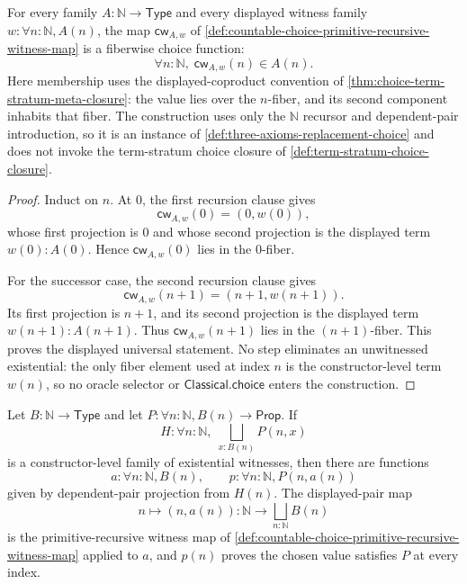 \begin{theorem}
\label{thm:countable-choice-primitive-recursive-witness-function}
For every family $A:\mathbb{N}\to\mathsf{Type}$ and every displayed witness family $w:\forall n:\mathbb{N},A(n)$, the map $\mathsf{cw}_{A,w}$ of \autoref{def:countable-choice-primitive-recursive-witness-map} is a fiberwise choice function:
$$
\forall n:\mathbb{N},\;\mathsf{cw}_{A,w}(n)\in A(n).
$$
Here membership uses the displayed-coproduct convention of \autoref{thm:choice-term-stratum-meta-closure}: the value lies over the $n$-fiber, and its second component inhabits that fiber. The construction uses only the $\mathbb{N}$ recursor and dependent-pair introduction, so it is an instance of \autoref{def:three-axioms-replacement-choice} and does not invoke the term-stratum choice closure of \autoref{def:term-stratum-choice-closure}.
\end{theorem}

\begin{proof}
Induct on $n$. At $0$, the first recursion clause gives
$$
\mathsf{cw}_{A,w}(0)=(0,w(0)),
$$
whose first projection is $0$ and whose second projection is the displayed term $w(0):A(0)$. Hence $\mathsf{cw}_{A,w}(0)$ lies in the $0$-fiber.

For the successor case, the second recursion clause gives
$$
\mathsf{cw}_{A,w}(n+1)=(n+1,w(n+1)).
$$
Its first projection is $n+1$, and its second projection is the displayed term $w(n+1):A(n+1)$. Thus $\mathsf{cw}_{A,w}(n+1)$ lies in the $(n+1)$-fiber. This proves the displayed universal statement. No step eliminates an unwitnessed existential: the only fiber element used at index $n$ is the constructor-level term $w(n)$, so no oracle selector or $\mathsf{Classical.choice}$ enters the construction.
\end{proof}

\begin{corollary}
\label{cor:witnessed-countable-choice-for-predicates}
Let $B:\mathbb{N}\to\mathsf{Type}$ and let $P:\forall n:\mathbb{N},B(n)\to\mathsf{Prop}$. If
$$
H:\forall n:\mathbb{N},\;\bigsqcup_{x:B(n)}P(n,x)
$$
is a constructor-level family of existential witnesses, then there are functions
$$
a:\forall n:\mathbb{N},B(n),\qquad p:\forall n:\mathbb{N},P(n,a(n))
$$
given by dependent-pair projection from $H(n)$. The displayed-pair map
$$
n\mapsto (n,a(n)):\mathbb{N}\to\bigsqcup_{n:\mathbb{N}}B(n)
$$
is the primitive-recursive witness map of \autoref{def:countable-choice-primitive-recursive-witness-map} applied to $a$, and $p(n)$ proves the chosen value satisfies $P$ at every index.
\end{corollary}

